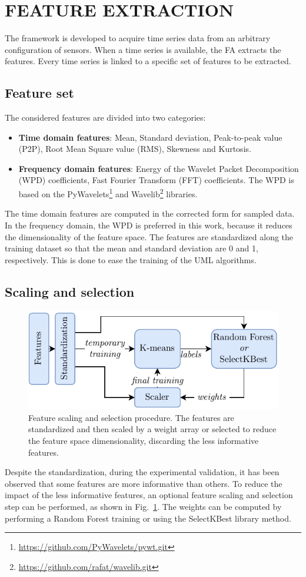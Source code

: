 \section{FEATURE EXTRACTION}
The framework is developed to acquire time series data from an arbitrary configuration of sensors. When a time series is available, the FA extracts the features. Every time series is linked to a specific set of features to be extracted.

\subsection{Feature set}
The considered features are divided into two categories:
\begin{itemize}
    \item \textbf{Time domain features}: Mean, Standard deviation, Peak-to-peak value (P2P), Root Mean Square value (RMS), Skewness and Kurtosis.
    \item \textbf{Frequency domain features}: Energy of the Wavelet Packet Decomposition (WPD) coefficients, Fast Fourier Transform (FFT) coefficients. The WPD is based on the PyWavelets\footnote{\url{https://github.com/PyWavelets/pywt.git}} and Wavelib\footnote{\url{https://github.com/rafat/wavelib.git}} libraries.
\end{itemize}

The time domain features are computed in the corrected form for sampled data. In the frequency domain, the WPD is preferred in this work, because it reduces the dimensionality of the feature space. The features are standardized along the training dataset so that the mean and standard deviation are 0 and 1, respectively. This is done to ease the training of the UML algorithms.

\subsection{Scaling and selection}
\begin{figure}
    \includegraphics[width=\linewidth]{images/Feat_scaling.pdf}
    \caption{Feature scaling and selection procedure. The features are standardized and then scaled by a weight array or selected to reduce the feature space dimensionality, discarding the less informative features.}
    \label{fig:feature_scaling}
\end{figure}
Despite the standardization, during the experimental validation, it has been observed that some features are more informative than others. To reduce the impact of the less informative features, an optional feature scaling and selection step can be performed, as shown in Fig.~\ref{fig:feature_scaling}. The weights can be computed by performing a Random Forest training or using the SelectKBest library method.